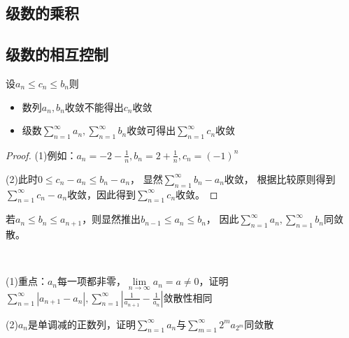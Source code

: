 \subsection{级数的乘积}


\subsection{级数的相互控制}

\begin{theorem}[级数相互控制]
  设$a_n \leq c_n \leq b_n$则
  \begin{itemize}
  \item 数列$a_n,b_n$收敛不能得出$c_n$收敛
  \item 级数$\sum\limits_{n = 1}^{\infty}a_n, \sum\limits_{n = 1}^{\infty}b_n$收敛可得出$\sum\limits_{n = 1}^{\infty}c_n$收敛
  \end{itemize}
\end{theorem}

\begin{proof}
  (1)例如：$a_n = -2 - \frac{1}{n}, b_n = 2 + \frac{1}{n}, c_n = (-1)^n$

  (2)此时$0 \leq c_n - a_n \leq b_n - a_n$，
  显然$\sum\limits_{n = 1}^{\infty}b_n - a_n$收敛，
  根据比较原则得到$\sum\limits_{n = 1}^{\infty}c_n - a_n$收敛，因此得到$\sum\limits_{n = 1}^{\infty} c_n$收敛。
\end{proof}

\begin{corollary}[控制是相互的]
  若$a_n \leq b_n \leq a_{n+1}$，则显然推出$b_{n-1} \leq a_n \leq b_n$，
  因此$\sum\limits_{n = 1}^{\infty}a_n, \sum\limits_{n = 1}^{\infty}b_n$同敛散。
\end{corollary}

~

\begin{exercise}[相互控制练习]
  (1)重点：$a_n$每一项都非零，$\lim \limits _{n \rightarrow \infty} a_n = a \neq 0$，证明$\sum\limits_{n = 1}^{\infty}|a_{n+1} - a_n|, \sum\limits_{n = 1}^{\infty} \left| \frac{1}{a_{n+1}} - \frac{1}{a_n} \right|$敛散性相同

  (2)$a_n$是单调减的正数列，证明$\sum\limits_{n = 1}^{\infty}a_n$与$\sum\limits_{m = 1}^{\infty}2^m a_{2^m}$同敛散
\end{exercise}

